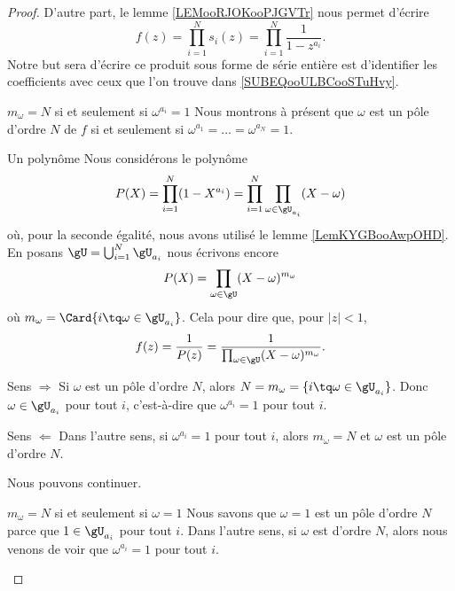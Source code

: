 \begin{proof}
    D'autre part, le lemme \ref{LEMooRJOKooPJGVTr} nous permet d'écrire
    \begin{equation}
        f(z)=\prod_{i=1}^Ns_i(z)=\prod_{i=1}^N\frac{1}{ 1-z^{a_i} }.
    \end{equation}
    Notre but sera d'écrire ce produit sous forme de série entière est d'identifier les coefficients avec ceux que l'on trouve dans \eqref{SUBEQooULBCooSTuHvy}.

    \begin{subproof}
    \item[\( m_{\omega}=N\) si et seulement si \( \omega^{a_i}=1\)]
    Nous montrons à présent que \( \omega\) est un pôle d'ordre \( N\) de \( f\) si et seulement si \( \omega^{a_1}=\ldots=\omega^{a_N}=1\).
    \begin{subproof}
    \item[Un polynôme]
        Nous considérons le polynôme
        \begin{equation}
            P(X)=\prod_{i=1}^N(1-X^{a_i})=\prod_{i=1}^N\prod_{\omega\in \gU_{a_i}}(X-\omega)
        \end{equation}
        où, pour la seconde égalité, nous avons utilisé le lemme \ref{LemKYGBooAwpOHD}. En posans \( \gU=\bigcup_{i=1}^N\gU_{a_i}\) nous écrivons encore
        \begin{equation}
            P(X)=\prod_{\omega\in \gU}(X-\omega)^{m_{\omega}}
        \end{equation}
        où \( m_{\omega}=\Card\{ i\tq \omega\in \gU_{a_i} \}\). Cela pour dire que, pour \( | z |<1\),
        \begin{equation}
            f(z)=\frac{1}{ P(z) }=\frac{1}{ \prod_{\omega\in \gU} (X-\omega)^{m_{\omega}}}.
        \end{equation}
    \item[Sens \( \Rightarrow\)]
        Si \( \omega\) est un pôle d'ordre \( N\), alors \( N=m_{\omega}=\{ i\tq \omega\in \gU_{a_i} \}\). Donc \( \omega\in \gU_{a_i}\) pour tout \( i\), c'est-à-dire que \( \omega^{a_i}=1\) pour tout \( i\).
    \item[Sens \( \Leftarrow\)]
        Dans l'autre sens, si \( \omega^{a_i}=1\) pour tout \( i\), alors \( m_{\omega}=N\) et \( \omega\) est un pôle d'ordre \( N\).
    \end{subproof}

    Nous pouvons continuer.
    \item[\( m_{\omega}=N\) si et seulement si \( \omega=1\)]
        Nous savons que \( \omega=1\) est un pôle d'ordre \( N\) parce que \( 1\in \gU_{a_i}\) pour tout \( i\). Dans l'autre sens, si \( \omega\) est d'ordre \( N\), alors nous venons de voir que \( \omega^{a_i}=1\) pour tout \( i\).


\end{subproof}
\end{proof}
